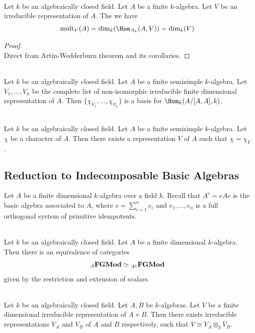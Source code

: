 \documentclass[a4paper]{article}
\begin{document}
\begin{crl}{}{}\\
Let $k$ be an algebraically closed field. Let $A$ be a finite $k$-algebra. Let $V$ be an irreducible representation of $A$. The we have $$\text{mult}_V(A)=\dim_k(\Hom_{A_k}(A,V))=\dim_k(V)$$
\begin{proof}\\
Direct from Artin-Wedderburn theorem and its corollaries. 
\end{proof}
\end{crl}

\begin{prp}{}{}\\
Let $k$ be an algebraically closed field. Let $A$ be a finite semisimple $k$-algebra. Let $V_1,\dots,V_n$ be the complete list of non-isomorphic irreducible finite dimensional representation of $A$. Then $\{\chi_{V_1},\dots,\chi_{V_n}\}$ is a basis for $\Hom_k(A/[A,A],k)$. 
\end{prp}

\begin{crl}{}{}\\
Let $k$ be an algebraically closed field. Let $A$ be a finite semisimple $k$-algebra. Let $\chi$ be a character of $A$. Then there exists a representation $V$ of $A$ such that $\chi=\chi_V$. 
\end{crl}

\subsection{Reduction to Indecomposable Basic Algebras}
Let $A$ be a finite dimensional $k$-algebra over a field $k$. Recall that $A^\flat=eAe$ is the basic algebra associated to $A$, where $e=\sum_{i=1}^ne_i$ and $e_1,\dots,e_n$ is a full orthogonal system of primitive idempotents. 

\begin{prp}{}{}\\
Let $k$ be an algebraically closed field. Let $A$ be a finite dimensional $k$-algebra. Then there is an equivalence of categories $$
{_A}\bold{FGMod}\simeq{_{A^\flat}}\bold{FGMod}$$ given by the restriction and extension of scalars. 
\end{prp}

\begin{prp}{}{}\\
Let $k$ be an algebraically closed field. Let $A,B$ be $k$-algebras. Let $V$ be a finite dimensional irreducible representation of $A\times B$. Then there exists irreducible representations $V_A$ and $V_B$ of $A$ and $B$ respectively, such that $V\cong V_A\otimes_k V_B$. 
\end{prp}
\end{document}
